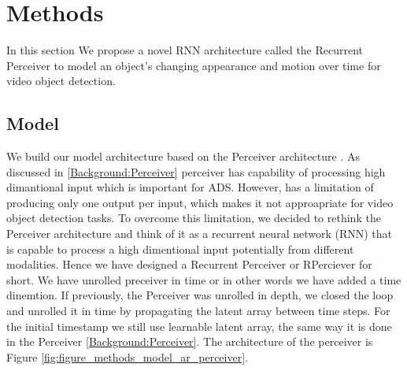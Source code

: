 \section{Methods}  \label{Methods}

In this section We propose a novel RNN architecture called the Recurrent Perceiver to model an object's changing appearance and motion over time for video object detection.

\subsection{Model} \label{Methods:Model}

We build our model architecture based on the Perceiver architecture \cite{jaeglePerceiverGeneralPerception2021}. As discussed in \ref{Background:Perceiver} perceiver has capability of processing high dimantional input which is important for ADS. However, has a limitation of producing only one output per input, which makes it not approapriate for video object detection tasks. To overcome this limitation, we decided to rethink the Perceiver architecture and think of it as a recurrent neural network (RNN) that is capable to process a high dimentional input potentially from different modalities. Hence we have designed a Recurrent Perceiver or RPerciever for short. We have unrolled preceiver in time or in other words we have added a time dinemtion. If previously, the Perceiver was unrolled in depth, we closed the loop and unrolled it in time by propagating the latent array between time steps. For the initial timestamp we still use learnable latent array, the same way it is done in the Perceiver \ref{Background:Perceiver}. The architecture of the perceiver is Figure \ref{fig:figure_methods_model_ar_perceiver}.



